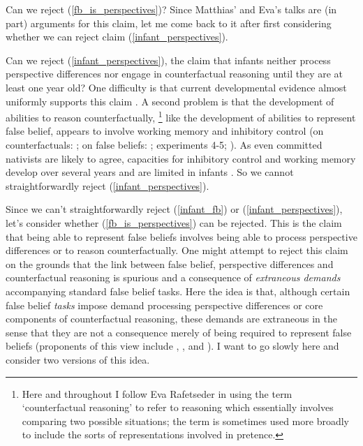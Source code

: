 \documentclass[12pt,\papersize]{extarticle}
\begin{document}
Can we reject (\ref{fb_is_perspectives})?
Since Matthias' and Eva's talks are (in part) arguments for this claim, let me come back to it after first considering whether we can reject 
claim (\ref{infant_perspectives}).

Can we reject (\ref{infant_perspectives}), the claim that infants neither process perspective differences nor engage in counterfactual reasoning until they are at least one year old?
One difficulty is that current developmental evidence almost uniformly supports this claim  \citep{rafetseder:2010_counterfactual,beck:2011_almost}.
A second problem is that the development of abilities to reason counterfactually,%
\footnote{Here and throughout I follow Eva Rafetseder in using the term `counterfactual reasoning'  to refer to reasoning which essentially involves comparing two possible situations; the term is sometimes used more broadly to include the sorts of representations involved in pretence.} 
like the development of abilities to represent false belief,
appears to involve working memory and inhibitory control 
(on counterfactuals: 
	\citealp{drayton:2011_counterfactual,beck:2011_supporting};
on false beliefs: \citealp{en_1412, en_1698}; \citealp{lin:2010_reflexively, en_1547} experiments 4-5; \citealp{saxe_reading_2006}).
As even committed nativists are likely to agree, capacities for inhibitory control and working memory develop over several years and are limited in infants \citep[e.g.][]{carlson:2005_developmentally}.
So we cannot straightforwardly reject (\ref{infant_perspectives}).

Since we can't straightforwardly reject (\ref{infant_fb}) or (\ref{infant_perspectives}),
let's consider whether (\ref{fb_is_perspectives}) can be rejected.
This is the claim that being able to represent false beliefs involves being able to process perspective differences or to reason counterfactually.
One might attempt to reject this claim on the grounds that the link between false belief, perspective differences and counterfactual reasoning 
is spurious and a consequence of \emph{extraneous demands} accompanying standard false belief tasks.
Here the idea is that, although certain false belief \emph{tasks} impose demand processing perspective differences or core components of counterfactual reasoning,
these demands are extraneous in the sense that they are not a consequence merely of being required to represent false beliefs
(proponents of this view include 
	\citealp[p.\ 417]{Carpenter:2002gc},
	\citealp{Bloom:2000bt}, and
	\citealp{Leslie:1998nq}).
I want to go slowly here and consider two versions of this idea.
\end{document}
